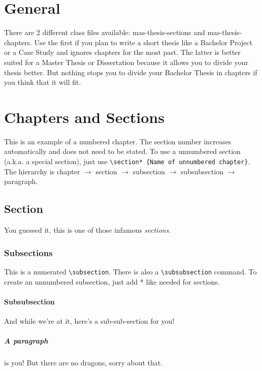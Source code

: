 \documentclass[masterthesis, english]{mas-thesis-chapters} %
\begin{document}
\chapter{General}

There are 2 different class files available: mas-thesis-sections and mas-thesis-chapters. Use the first if you plan to write a short thesis like a Bachelor Project or a Case Study and ignores chapters for the most past. The latter is better suited for a Master Thesis or Dissertation because it allows you to divide your thesis better. But nothing stops you to divide your Bachelor Thesis in chapters if you think that it will fit.



\chapter{Chapters and Sections}

This is an example of a numbered chapter. The section number increases automatically and does not need to be stated. To use a unnumbered section (a.k.a. a special section), just use \texttt{\textbackslash section* \{Name of unnumbered chapter\}}. The hierarchy is chapter $\rightarrow$ section $\rightarrow$ subsection $\rightarrow$ subsubsection $\rightarrow$ paragraph.

\section{Section}

You guessed it, this is one of those infamous \textit{sections}.

\subsection{Subsections}

This is a numerated \texttt{\textbackslash subsection}. There is also a \texttt{\textbackslash subsubsection} command. To create an unnumbered subsection, just add * like needed for sections.

\subsubsection{Subsubsection}

And while we're at it, here's a sub-sub-section for you!

\paragraph{A paragraph} is you! But there are no dragons, sorry about that.
\end{document}

